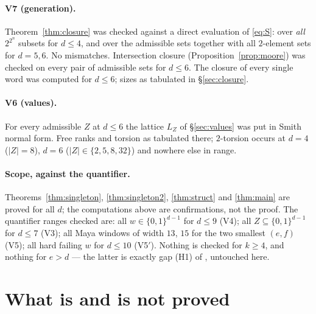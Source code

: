 \documentclass[11pt]{article}
\theoremstyle{definition}
\theoremstyle{remark}
\newcommand{\cube}{\{0,1\}}
\begin{document}
\paragraph{V7 (generation).}  Theorem~\ref{thm:closure} was checked against a direct
evaluation of \eqref{eq:S}: over \emph{all} $2^{2^{n}}$ subsets for $d\le4$, and over the
admissible sets together with all $2$-element sets for $d=5,6$.  No mismatches.  Intersection
closure (Proposition~\ref{prop:moore}) was checked on every pair of admissible sets for $d\le6$.
The closure of every single word was computed for $d\le6$; sizes as tabulated in
\S\ref{sec:closure}.

\paragraph{V6 (values).}  For every admissible $Z$ at $d\le6$ the lattice $L_Z$ of
\S\ref{sec:values} was put in Smith normal form.  Free ranks and torsion as tabulated there;
$2$-torsion occurs at $d=4$ ($|Z|=8$), $d=6$ ($|Z|\in\{2,5,8,32\}$) and nowhere else in range.

\paragraph{Scope, against the quantifier.}  Theorems~\ref{thm:singleton},
\ref{thm:singleton2}, \ref{thm:struct} and \ref{thm:main} are proved for all $d$; the
computations above are confirmations, not the proof.  The quantifier ranges checked are: all
$w\in\cube^{d-1}$ for $d\le9$ (V4); all $Z\subseteq\cube^{d-1}$ for $d\le7$ (V3); all Maya
windows of width $13$, $15$ for the two smallest $(e,f)$ (V5); all hard failing $w$ for
$d\le10$ (V5$'$).  Nothing is checked for $k\ge4$, and nothing for $e>d$ --- the latter is
exactly gap (H1) of \cite{Q150c1}, untouched here.

\section{What is and is not proved}\label{sec:gaps}
\end{document}
